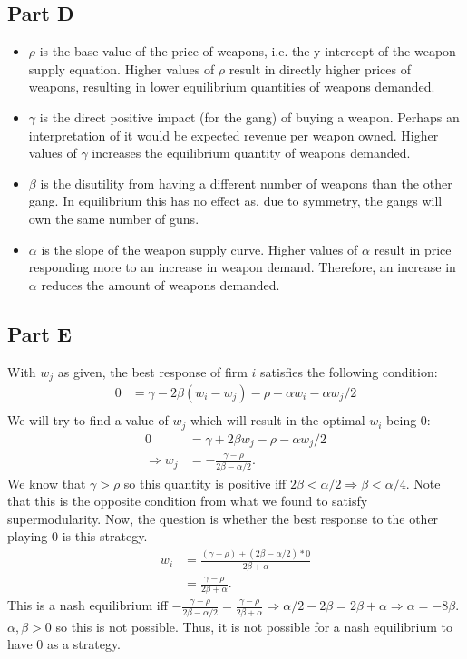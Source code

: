 \documentclass[11pt]{article} %
\begin{document}
\subsection{Part D}
\begin{itemize}
\item
$\rho$ is the base value of the price of weapons, i.e. the y intercept of the weapon supply equation. Higher values of $\rho$ result in directly higher prices of weapons, resulting in lower equilibrium quantities of weapons demanded.
\item
$\gamma$ is the direct positive impact (for the gang) of buying a weapon. Perhaps an interpretation of it would be expected revenue per weapon owned. Higher values of $\gamma$ increases the equilibrium quantity of weapons demanded.
\item
$\beta$ is the disutility from having a different number of weapons than the other gang. In equilibrium this has no effect as, due to symmetry, the gangs will own the same number of guns.
\item
$\alpha$ is the slope of the weapon supply curve. Higher values of $\alpha$ result in price responding more to an increase in weapon demand. Therefore, an increase in $\alpha$ reduces the amount of weapons demanded.
\end{itemize}
\subsection{Part E}
With $w_j$ as given, the best response of firm $i$ satisfies the following condition:
\begin{align*}
0 &= \gamma - 2\beta (w_i - w_j) - \rho -\alpha w_i - \alpha w_j/2\\
\end{align*}
We will try to find a value of $w_j$ which will result in the optimal $w_i$ being $0$:
\begin{align*}
0 &= \gamma +2\beta  w_j - \rho - \alpha w_j/2\\
\Rightarrow w_j &= -\frac{\gamma - \rho}{2\beta - \alpha/2}.
\end{align*}
We know that $\gamma>\rho$ so this quantity is positive iff $2\beta<\alpha/2 \Rightarrow \beta<\alpha/4$. Note that this is the opposite condition from what we found to satisfy supermodularity. %
Now, the question is whether the best response to the other playing 0 is this strategy.
\begin{align*}
w_i &= \frac{(\gamma - \rho) + (2\beta - \alpha /2)*0}{2\beta + \alpha}\\
&= \frac{\gamma - \rho}{2\beta + \alpha}.
\end{align*}
This is a nash equilibrium iff $ -\frac{\gamma - \rho}{2\beta - \alpha/2}= \frac{\gamma - \rho}{2\beta + \alpha} \Rightarrow \alpha/2 - 2\beta = 2\beta + \alpha \Rightarrow \alpha = -8\beta$. $\alpha,\beta>0$ so this is not possible. Thus, it is not possible for a nash equilibrium to have $0$ as a strategy.
\end{document}
